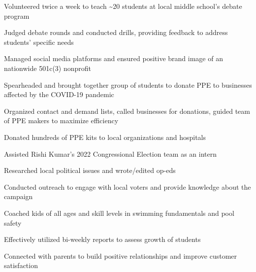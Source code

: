 \documentclass[letterpaper]{resume-shreeram}
\begin{document}
\begin{compactitem}
  \item Volunteered twice a week to teach \textasciitilde{}20 students
  at local middle school's debate program

  \item Judged debate rounds and conducted drills, providing feedback
  to address students' specific needs
\end{compactitem}

\begin{compactitem}
  \item Managed social media platforms and ensured positive brand
  image of an nationwide 501c(3) nonprofit
\end{compactitem}

\begin{compactitem}
  \item Spearheaded and brought together group of students to donate PPE
  to businesses affected by the COVID-19 pandemic

  \item Organized contact and demand lists, called businesses for
  donations, guided team of PPE makers to maximize efficiency

  \item Donated hundreds of PPE kits to local organizations and
  hospitals
\end{compactitem}

\begin{compactitem}
  \item Assisted Rishi Kumar's 2022 Congressional Election team as an
  intern

  \item Researched local political issues and wrote/edited op-eds

  \item Conducted outreach to engage with local voters and provide
  knowledge about the campaign
\end{compactitem}

\begin{compactitem}
  \item Coached kids of all ages and skill levels in swimming
  fundamentals and pool safety

  \item Effectively utilized bi-weekly reports to assess growth of
  students

  \item Connected with parents to build positive relationships and
  improve customer satisfaction
\end{compactitem}
\end{document}
